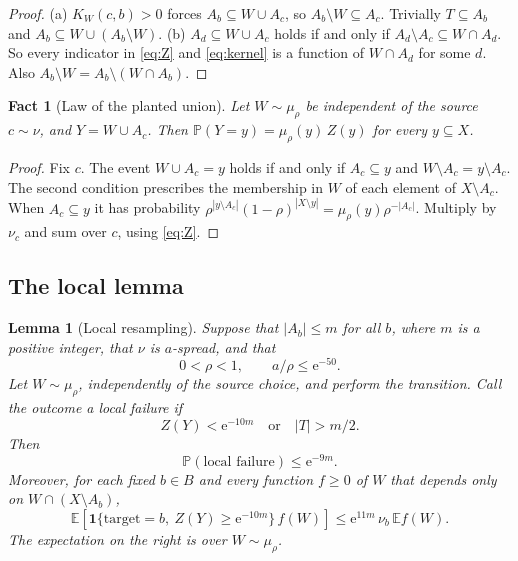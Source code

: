 \documentclass[11pt]{article}
\newtheorem{lemma}[theorem]{Lemma}
\newtheorem{fact}{Fact}
\numberwithin{equation}{section}
\newcommand{\PP}{\mathbb P}
\newcommand{\EE}{\mathbb E}
\newcommand{\ind}{\mathbf 1}
\newcommand{\ee}{\mathrm e}
\begin{document}
\begin{proof}
(a) $K_W(c,b)>0$ forces $A_b\subseteq W\cup A_c$, so
$A_b\setminus W\subseteq A_c$. Trivially $T\subseteq A_b$ and
$A_b\subseteq W\cup(A_b\setminus W)$.
(b) $A_d\subseteq W\cup A_c$ holds if and only if
$A_d\setminus A_c\subseteq W\cap A_d$. So every indicator in
\eqref{eq:Z} and \eqref{eq:kernel} is a function of $W\cap A_d$ for
some $d$. Also $A_b\setminus W=A_b\setminus(W\cap A_b)$.
\end{proof}

\begin{fact}[Law of the planted union]\label{fact:B}
Let $W\sim\mu_\rho$ be independent of the source $c\sim\nu$, and
$Y=W\cup A_c$. Then $\PP(Y=y)=\mu_\rho(y)\,Z(y)$ for every
$y\subseteq X$.
\end{fact}

\begin{proof}
Fix $c$. The event $W\cup A_c=y$ holds if and only if $A_c\subseteq y$
and $W\setminus A_c=y\setminus A_c$. The second condition prescribes
the membership in $W$ of each element of $X\setminus A_c$. When
$A_c\subseteq y$ it has probability
$\rho^{|y\setminus A_c|}(1-\rho)^{|X\setminus y|}
=\mu_\rho(y)\rho^{-|A_c|}$. Multiply by $\nu_c$ and sum over $c$,
using \eqref{eq:Z}.
\end{proof}

\subsection{The local lemma}

\begin{lemma}[Local resampling]\label{lem:local}
Suppose that $|A_b|\le m$ for all $b$, where $m$ is a positive integer,
that $\nu$ is $a$-spread, and that
\[
 0<\rho<1,\qquad a/\rho\le\ee^{-50}.
\]
Let $W\sim\mu_\rho$, independently of the source choice, and perform
the transition. Call the outcome a \emph{local failure} if
\[
 Z(Y)<\ee^{-10m}\quad\text{or}\quad |T|>m/2.
\]
Then
\begin{equation}\label{eq:local-failure}
 \PP(\text{local failure})\le\ee^{-9m}.
\end{equation}
Moreover, for each fixed $b\in B$ and every function $f\ge0$ of $W$
that depends only on $W\cap(X\setminus A_b)$,
\begin{equation}\label{eq:distortion}
 \EE\!\left[
  \ind\{\mathrm{target}=b,\ Z(Y)\ge\ee^{-10m}\}\, f(W)
 \right]
 \le \ee^{11m}\,\nu_b\,\EE f(W).
\end{equation}
The expectation on the right is over $W\sim\mu_\rho$.
\end{lemma}
\end{document}
